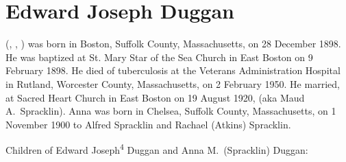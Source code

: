 \section{Edward Joseph Duggan}\label{per:Edward4Duggan}

 (, , ) was born in Boston, Suffolk County, Massachusetts, on 28 December 1898. He was baptized at St. Mary Star of the Sea Church in East Boston on 9 February 1898.\cite{Edward4DugganBirth} He died of tuberculosis at the Veterans Administration Hospital in Rutland, Worcester County, Massachusetts, on 2 February 1950.\cite{Edward4DugganDeath} He married, at Sacred Heart Church in East Boston on 19 August 1920, \cite{Edward4DugganMarriage} (aka Maud A.\ Spracklin). Anna was born in Chelsea, Suffolk County, Massachusetts, on 1 November 1900 to Alfred Spracklin and Rachael (Atkins) Spracklin.\cite{AnnaSpracklinBirth}

\begin{KidsIntro}
	Children of Edward Joseph\textsuperscript{4} Duggan and Anna M.\ (Spracklin) Duggan:
\end{KidsIntro}

\begin{Kids}
	
	
	
	
\end{Kids}